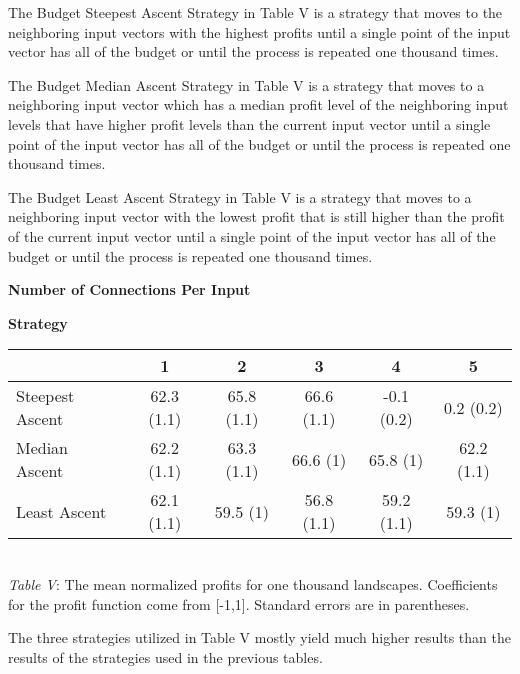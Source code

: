 The Budget Steepest Ascent Strategy in Table V is a strategy that moves
to the neighboring input vectors with the highest profits until a single
point of the input vector has all of the budget or until the process is
repeated one thousand times.

The Budget Median Ascent Strategy in Table V is a strategy that moves to
a neighboring input vector which has a median profit level of the
neighboring input levels that have higher profit levels than the current
input vector until a single point of the input vector has all of the
budget or until the process is repeated one thousand times.

The Budget Least Ascent Strategy in Table V is a strategy that moves to
a neighboring input vector with the lowest profit that is still higher
than the profit of the current input vector until a single point of the
input vector has all of the budget or until the process is repeated one
thousand times.

\begin{center}
\hspace{2cm} \textbf{Number of Connections Per Input}
\begin{flushleft}
\hspace{2.5cm} \textbf{Strategy}
\end{flushleft}
\begin{Schunk}

\begin{tabular}{l|c|c|c|c|c}
\hline
  & 1 & 2 & 3 & 4 & 5\\
\hline
Steepest Ascent & 62.3 (1.1) & 65.8 (1.1) & 66.6 (1.1) & -0.1 (0.2) & 0.2 (0.2)\\
\hline
Median Ascent & 62.2 (1.1) & 63.3 (1.1) & 66.6 (1) & 65.8 (1) & 62.2 (1.1)\\
\hline
Least Ascent & 62.1 (1.1) & 59.5 (1) & 56.8 (1.1) & 59.2 (1.1) & 59.3 (1)\\
\hline
\end{tabular}

\end{Schunk}
\\
\emph{Table V}: The mean normalized profits for one thousand landscapes. Coefficients for the profit function come from [-1,1]. Standard errors are in parentheses.
\end{center}

The three strategies utilized in Table V mostly yield much higher
results than the results of the strategies used in the previous tables.

